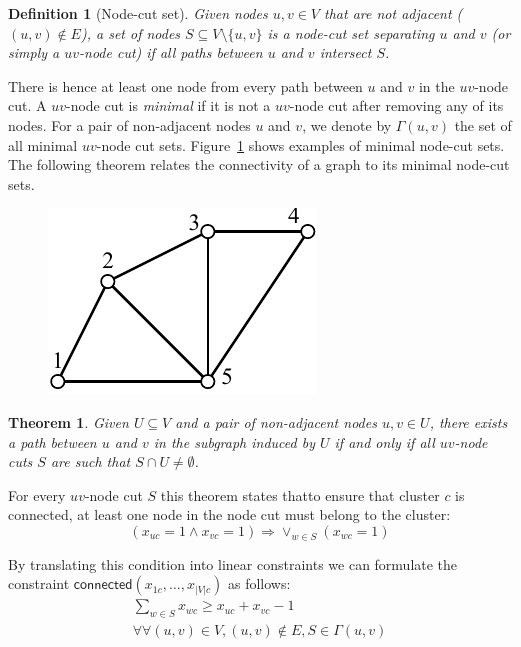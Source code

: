 \documentclass[conference]{IEEEtran}
\newtheorem{theorem}{Theorem}
\newtheorem{definition}{Definition}
\begin{document}
\begin{definition}[Node-cut set]
Given nodes $u, v \in V$ that are not adjacent ($(u, v) \notin E$), a set of nodes $S \subseteq V \setminus \{u, v\}$ is a \emph{node-cut set} separating $u$ and $v$ (or simply a \emph{$uv$-node cut}) if all paths between $u$ and $v$ intersect $S$.
\end{definition}
There is hence at least one node from every path between $u$ and $v$ in the $uv$-node cut.
A $uv$-node cut is \emph{minimal} if it is not a $uv$-node cut after removing any of its nodes. For a pair of non-adjacent nodes $u$ and $v$, we denote by $\Gamma(u, v)$ the set of all minimal $uv$-node cut sets. Figure~\ref{fig:cutset} shows examples of minimal node-cut sets. The following theorem relates the connectivity of a graph to its minimal node-cut sets. 
%
\begin{figure}
\centering
\includegraphics[scale=0.7]{images/cutset}
\captionsetup{font=small}
\label{fig:cutset}
\end{figure}
%
\begin{theorem}
Given $U \subseteq V$ and a pair of non-adjacent nodes $u, v \in U$, there exists a path between $u$ and $v$ in the subgraph induced by $U$ if and only if all $uv$-node cuts $S$ are such that $S \cap U \neq \emptyset$.
\label{theorem:cutset}
\end{theorem}
%
For every $uv$-node cut $S$ this theorem states thatto ensure that cluster $c$ is connected, at least one node in the node cut must belong to the cluster:
%
\begin{equation*}
(x_{uc}=1 \land x_{vc}=1) \Rightarrow \lor_{w \in S} (x_{wc}=1)
\end{equation*}

By translating this condition into linear constraints we can formulate the constraint $\mathsf{connected}(x_{1c}, \ldots, x_{|V|c})$ as follows:
%
\begin{multline}
\sum_{w \in S} x_{wc} \geq x_{uc} + x_{vc} - 1 \\
\forall \forall (u, v) \in V, (u, v) \notin E, S \in \Gamma(u, v)
\label{eq:connectivity}
\end{multline}
\end{document}
